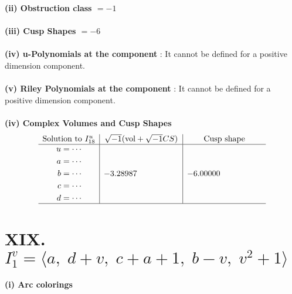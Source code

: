 \documentclass[1p]{elsarticle_modified}
\theoremstyle{definition}
\newcommand{\I}{\sqrt{-1}}
\begin{document}
\flushleft \textbf{(ii) Obstruction class $= -1$}\\~\\
\flushleft \textbf{(iii) Cusp Shapes $= -6$}\\~\\
\flushleft \textbf{(iv) u-Polynomials at the component} : It cannot be defined for a positive dimension component.\\~\\
\flushleft \textbf{(v) Riley Polynomials at the component} : It cannot be defined for a positive dimension component.\\~\\
\newpage\flushleft \textbf{(iv) Complex Volumes and Cusp Shapes}
$$\begin{array}{c|c|c} 
\text{Solution to }I^u_{18}& \I (\text{vol} + \sqrt{-1}CS) & \text{Cusp shape}\\
 \hline 
\begin{aligned}
u &= \cdots \\
a &= \cdots \\
b &= \cdots \\
c &= \cdots \\
d &= \cdots\end{aligned}
 & -3.28987\phantom{ +0.000000I} & -6.00000\phantom{ +0.000000I}\\
 \hline 
 \end{array}
$$\newpage\renewcommand{\arraystretch}{1}
\centering \section*{XIX. $I^v_{1}= \langle a,\;d+v,\;c+a+1,\;b- v,\;v^2+1 \rangle$}
\flushleft \textbf{(i) Arc colorings}\\
\end{document}
